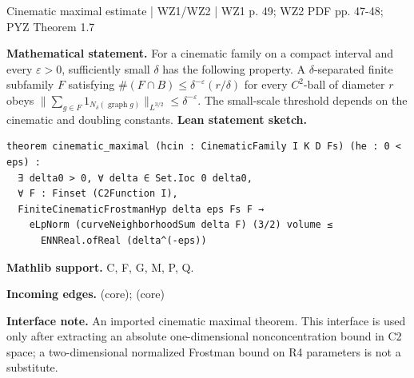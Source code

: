 \documentclass[10pt,a4paper]{article}
\newcommand{\nodecard}[1]{\hyperlink{node-#1}{\texttt{\detokenize{#1}}}}
\begin{document}
\begin{minipage}{\linewidth}
\hypertarget{node-T7_2}{}
\begin{tcolorbox}[colback=white,colframe=cinematicfg,colbacktitle=cinematicbg,coltitle=ink,boxrule=0.45pt,arc=1.6mm,left=3mm,right=3mm,top=2mm,bottom=2mm,title={\sffamily\bfseries WZ1 Thm. 7.2 = WZ2 Thm. 7.13 \hfill \texttt{T7\_2}}]
{\sffamily\small\color{muted}Cinematic maximal estimate | WZ1/WZ2 | WZ1 p. 49; WZ2 PDF pp. 47-48; PYZ Theorem 1.7}\par
\textbf{Mathematical statement.} For a cinematic family on a compact interval and every $\varepsilon>0$, sufficiently small $\delta$ has the following property.
A $\delta$-separated finite subfamily $F$ satisfying
$\#(F\cap B)\le\delta^{-\varepsilon}(r/\delta)$ for every $C^2$-ball of diameter $r$
obeys
$\|\sum_{g\in F}1_{N_\delta(\operatorname{graph}g)}\|_{L^{3/2}}\le\delta^{-\varepsilon}$.
The small-scale threshold depends on the cinematic and doubling constants.
\smallskip\textbf{Lean statement sketch.}
\begin{Verbatim}[fontsize=\small,breaklines=true,breakanywhere=true,tabsize=2]
theorem cinematic_maximal (hcin : CinematicFamily I K D Fs) (he : 0 < eps) :
  ∃ delta0 > 0, ∀ delta ∈ Set.Ioc 0 delta0,
  ∀ F : Finset (C2Function I),
  FiniteCinematicFrostmanHyp delta eps Fs F →
    eLpNorm (curveNeighborhoodSum delta F) (3/2) volume ≤
      ENNReal.ofReal (delta^(-eps))
\end{Verbatim}
{\footnotesize\textbf{Mathlib support.} C, F, G, M, P, Q.\par
\textbf{Incoming edges.} \nodecard{Dcinematic} (core); \nodecard{XPYZ} (core)\par}
{\footnotesize\textbf{Interface note.} An imported cinematic maximal theorem. This interface is used only after extracting an absolute one-dimensional nonconcentration bound in C2 space; a two-dimensional normalized Frostman bound on R4 parameters is not a substitute.}
\end{tcolorbox}\end{minipage}\par\medskip
\end{document}

